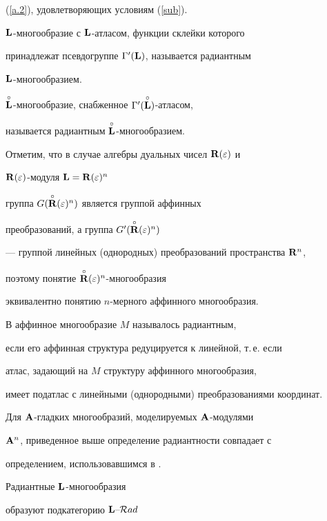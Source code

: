 (\ref{a.2}), удовлетворяющих условиям (\ref{sub}).





\begin{defn}


${\bold L}$-многообразие с ${\bold L}$-атласом, функции склейки которого


принадлежат псевдогруппе $\Gamma'({\bold L})$, называется радиантным


${\bold L}$-многообразием.





$\overset{\circ}{\bold L}{}$-многообразие, снабженное $\Gamma'(\overset{\circ}{\bold L}{})$-атласом,


называется радиантным $\overset{\circ}{\bold L}{}$-многообразием.


\end{defn}





Отметим, что в случае алгебры дуальных чисел ${\bold R}(\varepsilon)$ и


${\bold R}(\varepsilon)$-модуля ${\bold L}={\bold R}(\varepsilon)^n$


группа $G(\overset{\circ}{{\bold R}}{}(\varepsilon)^n)$ является группой аффинных


преобразований, а группа $G'(\overset{\circ}{{\bold R}}{}(\varepsilon)^n)$


--- группой линейных (однородных) преобразований пространства ${\bold R}^n$,


поэтому понятие $\overset{\circ}{{\bold R}}{}(\varepsilon)^n$-многообразия


эквивалентно понятию $n$-мерного аффинного многообразия.


В \cite{G-H} аффинное многообразие $M$ называлось радиантным,


если его аффинная структура редуцируется к линейной, т.\,е. если


атлас, задающий на $M$ структуру аффинного многообразия,


имеет податлас с линейными (однородными) преобразованиями координат.


Для ${\bold A}$-гладких многообразий, моделируемых ${\bold A}$-модулями


${\bold A}^n$, приведенное выше определение радиантности совпадает с


определением, использовавшимся в \cite{VSh29}.





Радиантные ${\bold L}$-многообразия


образуют подкатегорию ${{\bold L}}\text{--}{\cal R}ad$


